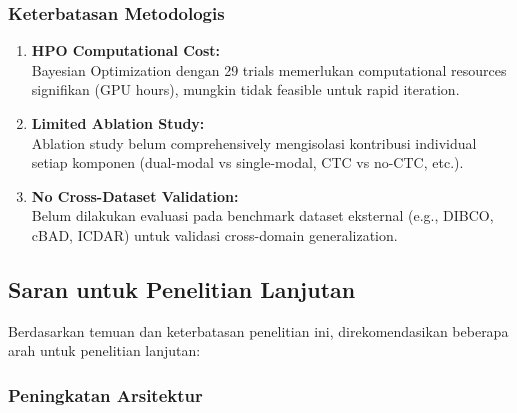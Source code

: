 \documentclass[12pt,a4paper]{article}
\begin{document}
\subsubsection{Keterbatasan Metodologis}

\begin{enumerate}[label=\arabic*., leftmargin=0.5cm]
    \item \textbf{HPO Computational Cost:} \\
    Bayesian Optimization dengan 29 trials memerlukan computational resources signifikan (GPU hours), mungkin tidak feasible untuk rapid iteration.
    
    \item \textbf{Limited Ablation Study:} \\
    [PLACEHOLDER] Ablation study belum comprehensively mengisolasi kontribusi individual setiap komponen (dual-modal vs single-modal, CTC vs no-CTC, etc.).
    
    \item \textbf{No Cross-Dataset Validation:} \\
    Belum dilakukan evaluasi pada benchmark dataset eksternal (e.g., DIBCO, cBAD, ICDAR) untuk validasi cross-domain generalization.
\end{enumerate}

\subsection{Saran untuk Penelitian Lanjutan}
\label{subsec:saran}
\vspace{0.8em}

Berdasarkan temuan dan keterbatasan penelitian ini, direkomendasikan beberapa arah untuk penelitian lanjutan:

\subsubsection{Peningkatan Arsitektur}
\end{document}
